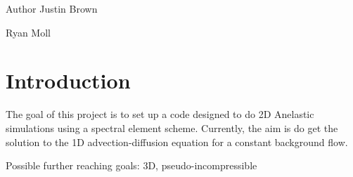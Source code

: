 



\begin{DoxyAuthor}{Author}
Justin Brown 

Ryan Moll
\end{DoxyAuthor}
\hypertarget{index_Introduction}{}\section{Introduction}\label{index_Introduction}
The goal of this project is to set up a code designed to do 2\-D Anelastic simulations using a spectral element scheme. Currently, the aim is do get the solution to the 1\-D advection-\/diffusion equation for a constant background flow.

Possible further reaching goals\-: 3\-D, pseudo-\/incompressible 